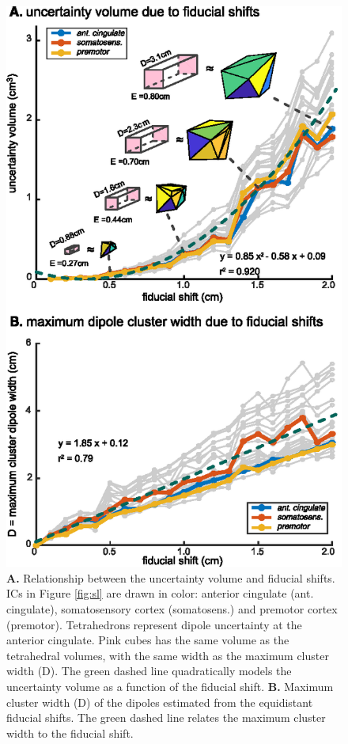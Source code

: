 \documentclass[../thesis_seyed.tex]{subfiles}
\begin{document}
\begin{figure}[h!]
      \centering
      \includegraphics[scale=1.0]{../img/fig2.eps}
      \caption{\textbf{A.} Relationship between the uncertainty volume and fiducial shifts. ICs in Figure \ref{fig:sl} are drawn in color: anterior cingulate (ant. cingulate), somatosensory cortex (somatosens.) and premotor cortex (premotor). Tetrahedrons represent dipole uncertainty at the anterior cingulate. Pink cubes has the same volume as the tetrahedral volumes, with the same width as the maximum cluster width (D). The green dashed line quadratically models the uncertainty volume as a function of the fiducial shift.
      \textbf{B.} Maximum cluster width (D) of the dipoles estimated from the equidistant fiducial shifts. The green dashed line relates the maximum cluster width to the fiducial shift.}
      \label{fig:unc}
\end{figure}
\end{document}
